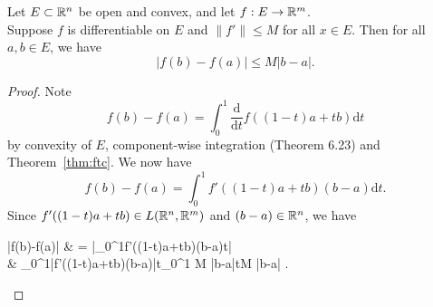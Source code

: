 \begin{thm}[19]
	Let $E \subset \mathbb{R}^{n}$ be open and convex, and let $f: E\to \mathbb{R}^{m}$.\\
	Suppose $f$ is differentiable on $E$ and $\|f'\|\le M$ for all $x \in E$.
	Then for all $a,b \in E$, we have
	\[
		\left|f(b)-f(a)\right|\le M \left|b-a\right|
		.\]
	\begin{proof}
		Note \[
			f(b)-f(a)=\int_{0}^{1}{\frac{\mathrm{d}}{\mathrm{d}t}f((1-t)a+tb)\mathrm{d}t}
		\]
		by convexity of $E$,  component-wise integration (Theorem 6.23) and Theorem~\ref{thm:ftc}.
		We now have \[
			f(b)-f(a)=\int_{0}^{1}{f'((1-t)a+tb)(b-a)\mathrm{d}t}
			.\]
		Since $f'((1-t)a+tb) \in L(\mathbb{R}^{n},\mathbb{R}^{m})$ and $(b-a) \in \mathbb{R}^{n}$, we have
		\begin{flalign*}
			\left|f(b)-f(a)\right| & = \left|\int_{0}^{1}{f'((1-t)a+tb)(b-a)t}\right|                                                                         \\
			                       & \le \int_{0}^{1}{\left|f'((1-t)a+tb)(b-a)\right|t}\le \int_{0}^{1}{ M \left|b-a\right|t}\le M \left|b-a\right|
			.\end{flalign*}
	\end{proof}
\end{thm}

